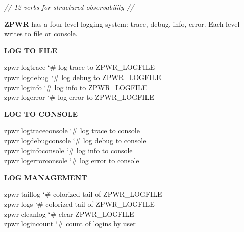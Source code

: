 \documentclass[11pt,a4paper,twoside]{book}
\begin{document}
{\small\itshape\color{dimtext} // 12 verbs for structured observability //}

\textbf{ZPWR} has a four-level logging system: trace, debug, info, error. Each level writes to file or console.


\vspace{12pt}
{\bfseries\color{neonyellow} LOG TO FILE}\vspace{4pt}

\begin{codebox}
\color{neongreen}zpwr logtrace              {\char`\#} log trace to ZPWR\_LOGFILE\\
\color{neongreen}zpwr logdebug              {\char`\#} log debug to ZPWR\_LOGFILE\\
\color{neongreen}zpwr loginfo               {\char`\#} log info to ZPWR\_LOGFILE\\
\color{neongreen}zpwr logerror              {\char`\#} log error to ZPWR\_LOGFILE\\
\end{codebox}


\vspace{12pt}
{\bfseries\color{neonyellow} LOG TO CONSOLE}\vspace{4pt}

\begin{codebox}
\color{neongreen}zpwr logtraceconsole       {\char`\#} log trace to console\\
\color{neongreen}zpwr logdebugconsole       {\char`\#} log debug to console\\
\color{neongreen}zpwr loginfoconsole        {\char`\#} log info to console\\
\color{neongreen}zpwr logerrorconsole       {\char`\#} log error to console\\
\end{codebox}


\vspace{12pt}
{\bfseries\color{neonyellow} LOG MANAGEMENT}\vspace{4pt}

\begin{codebox}
\color{neongreen}zpwr taillog               {\char`\#} colorized tail of ZPWR\_LOGFILE\\
\color{neongreen}zpwr logs                  {\char`\#} colorized tail of ZPWR\_LOGFILE\\
\color{neongreen}zpwr cleanlog              {\char`\#} clear ZPWR\_LOGFILE\\
\color{neongreen}zpwr logincount            {\char`\#} count of logins by user\\
\end{codebox}
\end{document}
